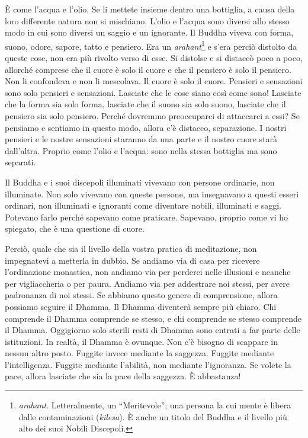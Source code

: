 È come l'acqua e l'olio. Se li mettete insieme dentro una bottiglia, a
causa della loro differente natura non si mischiano. L'olio e l'acqua
sono diversi allo stesso modo in cui sono diversi un saggio e un
ignorante. Il Buddha viveva con forma, suono, odore, sapore, tatto e
pensiero. Era un \emph{arahant}\footnote{\emph{arahant}. Letteralmente,
  un ``Meritevole''; una persona la cui mente è libera dalle
  contaminazioni (\emph{kilesa}). È anche un titolo del Buddha e il
  livello più alto dei suoi Nobili Discepoli.} e s'era perciò distolto
da queste cose, non era più rivolto verso di esse. Si distolse e si
distaccò poco a poco, allorché comprese che il cuore è solo il cuore e
che il pensiero è solo il pensiero. Non li confondeva e non li
mescolava. Il cuore è solo il cuore. Pensieri e sensazioni sono solo
pensieri e sensazioni. Lasciate che le cose siano così come sono!
Lasciate che la forma sia solo forma, lasciate che il suono sia solo
suono, lasciate che il pensiero sia solo pensiero. Perché dovremmo
preoccuparci di attaccarci a essi? Se pensiamo e sentiamo in questo
modo, allora c'è distacco, separazione. I nostri pensieri e le nostre
sensazioni staranno da una parte e il nostro cuore starà dall'altra.
Proprio come l'olio e l'acqua: sono nella stessa bottiglia ma sono
separati.

Il Buddha e i suoi discepoli illuminati vivevano con persone ordinarie,
non illuminate. Non solo vivevano con queste persone, ma insegnavano a
questi esseri ordinari, non illuminati e ignoranti come diventare
nobili, illuminati e saggi. Potevano farlo perché sapevano come
praticare. Sapevano, proprio come vi ho spiegato, che è una questione di
cuore.

Perciò, quale che sia il livello della vostra pratica di meditazione,
non impegnatevi a metterla in dubbio. Se andiamo via di casa per
ricevere l'ordinazione monastica, non andiamo via per perderci nelle
illusioni e neanche per vigliaccheria o per paura. Andiamo via per
addestrare noi stessi, per avere padronanza di noi stessi. Se abbiamo
questo genere di comprensione, allora possiamo seguire il Dhamma. Il
Dhamma diventerà sempre più chiaro. Chi comprende il Dhamma comprende se
stesso, e chi comprende se stesso comprende il Dhamma. Oggigiorno solo
sterili resti di Dhamma sono entrati a far parte delle istituzioni. In
realtà, il Dhamma è ovunque. Non c'è bisogno di scappare in nessun altro
posto. Fuggite invece mediante la saggezza. Fuggite mediante
l'intelligenza. Fuggite mediante l'abilità, non mediante l'ignoranza. Se
volete la pace, allora lasciate che sia la pace della saggezza. È
abbastanza!

